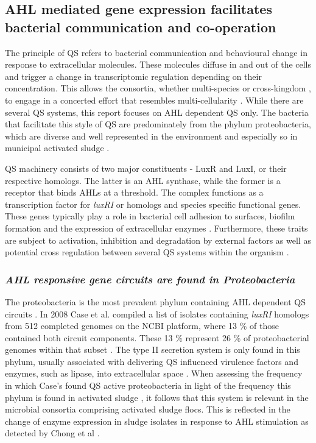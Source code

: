 \documentclass[11pt]{article}
\begin{document}
\subsection{AHL mediated gene expression facilitates bacterial communication and co-operation}
The principle of QS refers to bacterial communication and behavioural change in response to extracellular molecules. These molecules diffuse in and out of the cells and trigger a change in transcriptomic regulation depending on their concentration. This allows the consortia, whether multi-species or cross-kingdom \citep{williams2007quorum}, to engage in a concerted effort that resembles multi-cellularity \cite{kjelleberg2002}. While there are several QS systems, this report focuses on AHL dependent QS only. The bacteria that facilitate this style of QS are predominately from the phylum proteobacteria, which are diverse and well represented in the environment and especially so in municipal activated sludge \cite{Hesham_11,Wagner_02}.  


QS machinery consists of two major constituents - LuxR and LuxI, or their respective homologs. The latter is an AHL synthase, while the former is a receptor that binds AHLs at a threshold. The complex functions as a transcription factor for \textit{luxRI} or homologs and species specific functional genes. These genes typically play a role in bacterial cell adhesion to surfaces, biofilm formation and the expression of extracellular enzymes \cite{Flemming_10}.
Furthermore, these traits are subject to activation, inhibition and degradation by external factors as well as potential cross regulation between several QS systems within the organism \cite{juhas2005}.


\subsubsection{\emph{AHL responsive gene circuits are found in Proteobacteria}}
The proteobacteria is the most prevalent phylum containing AHL dependent QS circuits \cite{gelencser_12}. In 2008 Case et al. compiled a list of isolates containing \emph{luxRI} homologs from 512 completed genomes on the NCBI platform, where 13 \% of those contained both circuit components. These 13 \% represent 26 \% of proteobacterial genomes within that subset \cite{case_08}.
The type II secretion system is only found in this phylum, usually associated with delivering QS influenced virulence factors and enzymes, such as lipase, into extracellular space \cite{sandkvist2001}. 
When assessing the frequency in which Case's found QS active proteobacteria \cite{case_08} in light of the frequency this phylum is found in activated sludge \cite{Wagner_02,Hesham_11}, it follows that this system is relevant in the microbial consortia comprising activated sludge flocs. This is reflected in the change of enzyme expression in sludge isolates in response to AHL stimulation as detected by Chong et al \cite{Chong_12}. 
\end{document}
